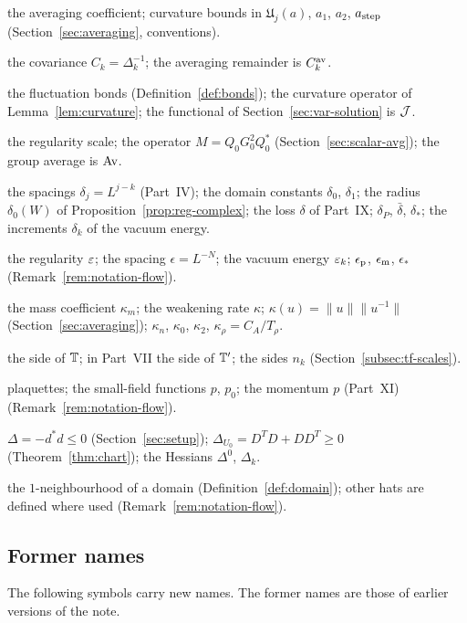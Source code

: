 {\begin{description}[font=\normalfont,style=nextline,leftmargin=10em,labelwidth=9.5em,labelsep=0.5em,itemsep=1pt,parsep=0pt,topsep=4pt]
\item[$a$] the averaging coefficient; curvature bounds in $\mathfrak U_j(a)$, $a_1$, $a_2$, $a_{\rm step}$ (Section~\ref{sec:averaging}, conventions).
\item[$C_k$] the covariance $C_k=\Delta_k^{-1}$; the averaging remainder is $C^{\rm av}_k$.
\item[$\mathfrak F$] the fluctuation bonds (Definition~\ref{def:bonds}); the curvature operator of Lemma~\ref{lem:curvature}; the functional of Section~\ref{sec:var-solution} is $\mathcal J$.
\item[$M$] the regularity scale; the operator $M=Q_0G_0^2Q_0^*$ (Section~\ref{sec:scalar-avg}); the group average is $\operatorname{Av}$.
\item[$\delta$] the spacings $\delta_j=L^{j-k}$ (Part~IV); the domain constants $\delta_0$, $\delta_1$; the radius $\delta_0(W)$ of Proposition~\ref{prop:reg-complex}; the loss $\delta$ of Part~IX; $\delta_P$, $\bar\delta$, $\delta_*$; the increments $\delta_k$ of the vacuum energy.
\item[$\eps$, $\epsilon$] the regularity $\eps$; the spacing $\epsilon=L^{-N}$; the vacuum energy $\varepsilon_k$; $\epsilon_{\rm p}$, $\epsilon_{\rm m}$, $\epsilon_*$ (Remark~\ref{rem:notation-flow}).
\item[$\kappa$] the mass coefficient $\kappa_m$; the weakening rate $\kappa$; $\kappa(u)=\|u\|\|u^{-1}\|$ (Section~\ref{sec:averaging}); $\kappa_n$, $\kappa_0$, $\kappa_2$, $\kappa_\rho=C_A/T_\rho$.
\item[$n$] the side of $\mathbb T$; in Part~VII the side of $\mathbb T'$; the sides $n_k$ (Section~\ref{subsec:tf-scales}).
\item[$p$] plaquettes; the small-field functions $p$, $p_0$; the momentum $p$ (Part~XI) (Remark~\ref{rem:notation-flow}).
\item[$\Delta$] $\Delta=-d^*d\le0$ (Section~\ref{sec:setup}); $\Delta_{U_0}=D^TD+DD^T\ge0$ (Theorem~\ref{thm:chart}); the Hessians $\Delta^0$, $\Delta_k$.
\item[$\hat X$] the $1$-neighbourhood of a domain (Definition~\ref{def:domain}); other hats are defined where used (Remark~\ref{rem:notation-flow}).
\end{description}}

\subsection*{Former names}

The following symbols carry new names. The former names are those of earlier versions of the note.

